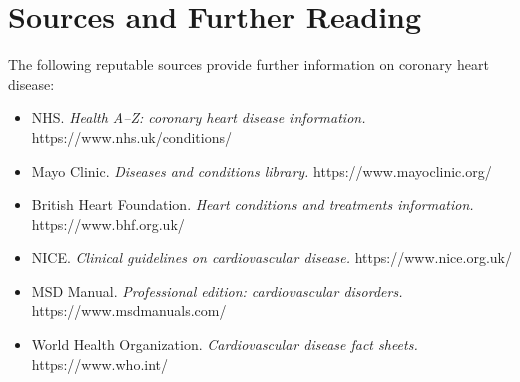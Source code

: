 \section*{Sources and Further Reading}
The following reputable sources provide further information on coronary heart disease:
\begin{itemize}
    \item NHS. \textit{Health A--Z: coronary heart disease information.} https://www.nhs.uk/conditions/
    \item Mayo Clinic. \textit{Diseases and conditions library.} https://www.mayoclinic.org/
    \item British Heart Foundation. \textit{Heart conditions and treatments information.} https://www.bhf.org.uk/
    \item NICE. \textit{Clinical guidelines on cardiovascular disease.} https://www.nice.org.uk/
    \item MSD Manual. \textit{Professional edition: cardiovascular disorders.} https://www.msdmanuals.com/
    \item World Health Organization. \textit{Cardiovascular disease fact sheets.} https://www.who.int/
\end{itemize}
